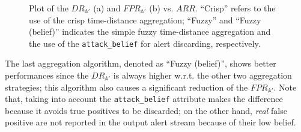\begin{figure}[p]
  \centering
  
  
  
  \caption{Plot of the $DR_{\mathbb{A}'}$ (a) and $FPR_{\mathbb{A}'}$
    (b) vs. $ARR$. ``Crisp'' refers to the use of the crisp
    time-distance aggregation; ``Fuzzy'' and ``Fuzzy (belief)''
    indicates the simple fuzzy time-distance aggregation and the use
    of the \texttt{attack\_belief} for alert discarding,
    respectively.}
  \label{fig:dr_fpr}
\end{figure}

The last aggregation algorithm, denoted as ``Fuzzy (belief)'', shows better performances since the $DR_{\mathbb{A}'}$ is always higher w.r.t. the other two aggregation strategies; this algorithm also causes a significant reduction of the $FPR_{\mathbb{A}'}$. Note that, taking into account the \texttt{attack\_belief} attribute makes the difference because it avoids true positives to be discarded; on the other hand, \emph{real} false positive are not reported in the output alert stream because of their low belief.

